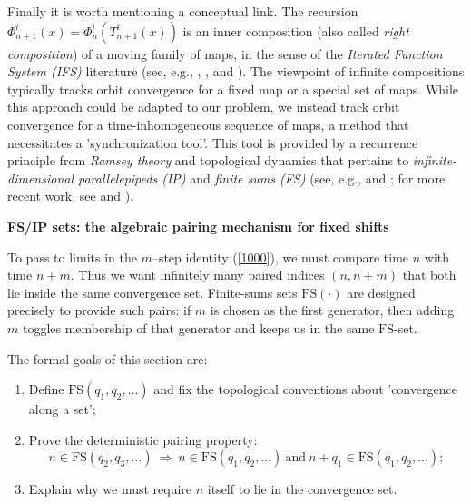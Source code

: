 \documentclass[onecolumn]{article}
\begin{document}
\medskip Finally it is worth mentioning a \noindent conceptual link\textbf{.}
The recursion $\Phi _{n+1}^{i}(x)=\Phi _{n}^{i}(T_{n+1}^{i}(x))$ is an inner
composition (also called \textit{right composition}) of a moving family of
maps, in the sense of the \textit{Iterated Function System (IFS)} literature
(see, e.g., \cite{[52]}, \cite{[54]}, and \cite{[53]}). The viewpoint of
infinite compositions typically tracks orbit convergence for a fixed map or
a special set of maps. While this approach could be adapted to our problem,
we instead track orbit convergence for a time-inhomogeneous sequence of
maps, a method that necessitates a 'synchronization tool'. This tool is
provided by a recurrence principle from \textit{Ramsey theory} and
topological dynamics that pertains to \textit{infinite-dimensional
parallelepipeds (IP)} and \textit{finite sums (FS)} (see, e.g., \cite{[57]}
and \cite{[58]}; for more recent work, see \cite{[55]} and \cite{[56]}%
).\hfill

\begin{flushleft}
\textbf{FS/IP sets: the algebraic pairing mechanism for fixed shifts}
\end{flushleft}

To pass to limits in the $m$--step identity (\ref{1000}), we must compare
time $n$ with time $n+m$. Thus we want infinitely many paired indices $%
(n,n+m)$ that both lie inside the same convergence set. Finite-sums sets $%
\mathrm{FS}(\cdot )$ are designed precisely to provide such pairs: if $m$ is
chosen as the first generator, then adding $m$ toggles membership of that
generator and keeps us in the same $\mathrm{FS}$-set.

\noindent The formal goals of this section are:

\begin{enumerate}
\item Define $\mathrm{FS}(q_{1},q_{2},\dots )$ and fix the topological
conventions about 'convergence along a set';

\item Prove the deterministic pairing property: 
\begin{equation}
n\in \mathrm{FS}(q_{2},q_{3},\dots )\ \Longrightarrow \ n\in \mathrm{FS}%
(q_{1},q_{2},\dots )\ \text{and}\ n+q_{1}\in \mathrm{FS}(q_{1},q_{2},\dots );
\label{1002}
\end{equation}

\item Explain why we must require $n$ itself to lie in the convergence set.
\end{enumerate}
\end{document}
